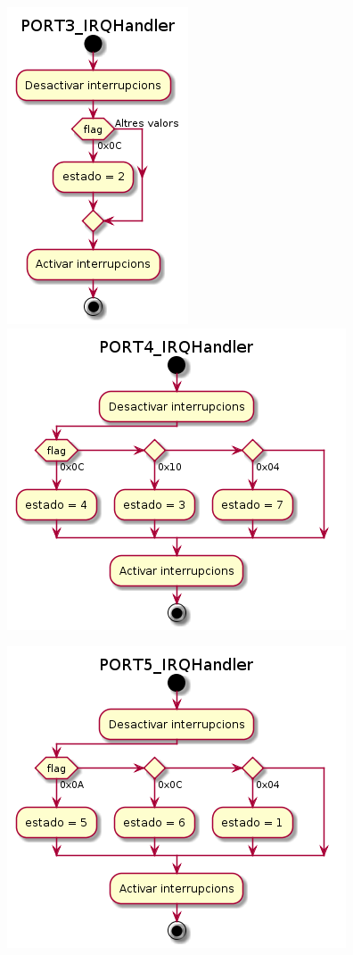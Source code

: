 \documentclass[12pt,a4paper]{article}
\begin{document}
\begin{figure}[H]
  \centering
  \includegraphics[scale=.6]{PORT3_IRQHandler}
  \includegraphics[scale=.6]{PORT4_IRQHandler}
\end{figure}

\begin{figure}[H]
  \centering
  \includegraphics[scale=.6]{PORT5_IRQHandler}
\end{figure}
\end{document}
